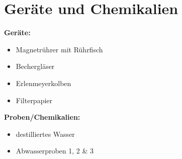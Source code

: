 \chapter{Geräte und Chemikalien}
\label{sec:geraete}

\textbf{Geräte:}
\begin{itemize}
	\item Magnetrührer mit Rührfisch
	\item Bechergläser
	\item Erlenmeyerkolben
	\item Filterpapier
\end{itemize}

\vspace*{5mm}

\textbf{Proben/Chemikalien:}
\begin{itemize}
	\item destilliertes Wasser
	\item Abwasserproben 1, 2 \& 3
\end{itemize}


